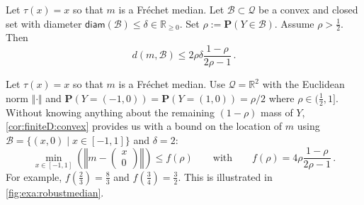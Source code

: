 \documentclass{article}
\newcommand*{\mc}[1]{\mathcal{#1}}
\newcommand{\R}{\mathbb{R}}
\newcommand{\Rp}{\R_{\geq0}}
\newcommand{\lb}{\left(} %
\newcommand{\rb}{\right)} %
\newcommand{\br}[1]{\lb #1 \rb} %
\newcommand{\brOf}[1]{\!\br{#1}} %
\newcommand{\normof}[1]{\Vert#1\Vert}
\newcommand{\normOf}[1]{\left\Vert#1\right\Vert}
\renewcommand{\Pr}{\mathbf{P}} %
\newcommand{\Prof}[1]{\Pr(#1)}
\newcommand{\setByEleInText}[2]{\{#1 \mid #2\}}
\newcommand{\eqfs}{\,.}
\newcommand{\tran}{\tau}
\newcommand{\diam}{\mathsf{diam}}
\begin{document}
%
\begin{corollary}\label{cor:finiteD:convex}
    Let $\tran(x)=x$ so that $m$ is a Fr\'echet median. 
    Let $\mc B \subset \mc Q$ be a convex and closed set with diameter $\diam(\mc B) \leq \delta \in \Rp$. Set $\rho := \Prof{Y \in \mc B}$.
    Assume $\rho > \frac{1}{2}$.
    Then
    \begin{equation}
        d(m, \mc B) \leq 2\rho \delta \frac{1 - \rho}{2\rho - 1}
        \eqfs
    \end{equation}
\end{corollary}
%
\begin{example}\label{exa:robustmedian}
    Let $\tran(x)=x$ so that $m$ is a Fr\'echet median. 
    Use $\mc Q = \R^2$ with the Euclidean norm $\normof{\cdot}$ and $\Prof{Y = (-1,0)} = \Prof{Y = (1,0)} = \rho/2$ where $\rho\in(\frac12, 1]$. Without knowing anything about the remaining $(1-\rho)$ mass of $Y$, \cref{cor:finiteD:convex} provides us with a bound on the location of $m$ using $\mc B = \setByEleInText{(x,0)}{x\in[-1,1]}$ and $\delta=2$:
    \begin{equation}
        \min_{x\in[-1,1]}\brOf{\normOf{m - \begin{pmatrix} x \\ 0 \end{pmatrix}}} \leq f(\rho)
        \qquad\text{with}\qquad f(\rho) = 4\rho \frac{1 - \rho}{2\rho - 1}
        \eqfs
    \end{equation}
    For example, $f(\frac23) = \frac83$ and $f(\frac34) = \frac32$. This is illustrated in \cref{fig:exa:robustmedian}.
\end{example}
%
\end{document}
